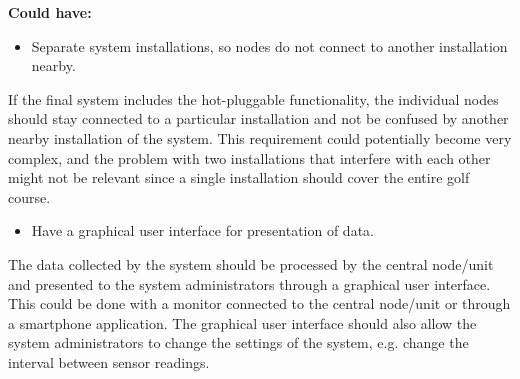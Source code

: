 \textbf{Could have:}
\begin{itemize}
\item Separate system installations, so nodes do not connect to another installation nearby.
\end{itemize}
If the final system includes the hot-pluggable functionality, the individual nodes should stay connected to a particular installation and not be confused by another nearby installation of the system. This requirement could potentially become very complex, and the problem with two installations that interfere with each other might not be relevant since a single installation should cover the entire golf course.

\begin{itemize}
\item Have a graphical user interface for presentation of data.
\end{itemize}
The data collected by the system should be processed by the central node/unit and presented to the system administrators through a graphical user interface. This could be done with a monitor connected to the central node/unit or through a smartphone application. The graphical user interface should also allow the system administrators to change the settings of the system, e.g. change the interval between sensor readings.








